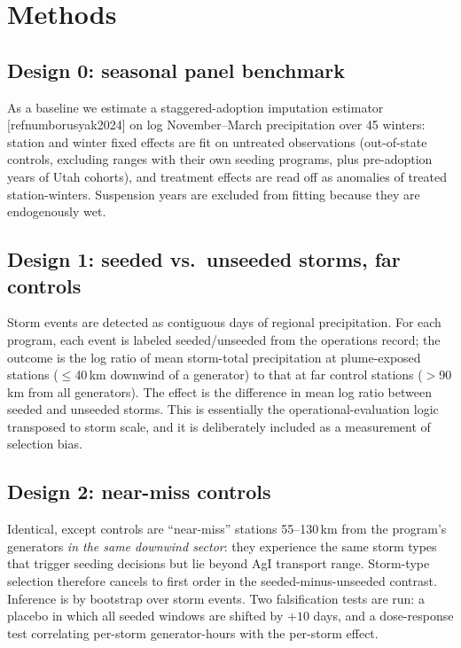 \documentclass[9pt,twocolumn,twoside]{article}
\newcommand{\citeparen}[1]{[\csname refnum#1\endcsname]}
\begin{document}
\section{Methods}

\subsection{Design 0: seasonal panel benchmark}
As a baseline we estimate a staggered-adoption imputation estimator
\citeparen{borusyak2024} on log November--March precipitation over 45
winters: station and winter fixed effects are fit on untreated observations
(out-of-state controls, excluding ranges with their own seeding programs,
plus pre-adoption years of Utah cohorts), and treatment effects are read off
as anomalies of treated station-winters. Suspension years are excluded from
fitting because they are endogenously wet.

\subsection{Design 1: seeded vs.\ unseeded storms, far controls}
Storm events are detected as contiguous days of regional precipitation.
For each program, each event is labeled seeded/unseeded from the operations
record; the outcome is the log ratio of mean storm-total precipitation at
plume-exposed stations ($\leq$40\,km downwind of a generator) to that at far
control stations ($>$90\,km from all generators). The effect is the
difference in mean log ratio between seeded and unseeded storms. This is
essentially the operational-evaluation logic transposed to storm scale, and
it is deliberately included as a measurement of selection bias.

\subsection{Design 2: near-miss controls}
Identical, except controls are ``near-miss'' stations 55--130\,km from the
program's generators \emph{in the same downwind sector}: they experience the
same storm types that trigger seeding decisions but lie beyond AgI transport
range. Storm-type selection therefore cancels to first order in the
seeded-minus-unseeded contrast. Inference is by bootstrap over storm events.
Two falsification tests are run: a placebo in which all seeded windows are
shifted by $+10$ days, and a dose-response test correlating per-storm
generator-hours with the per-storm effect.
\end{document}
